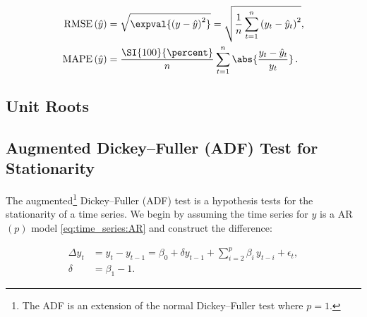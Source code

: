 \begin{subequations}\label{eq:time_series:RMSE_MAPE}
\begin{align}
\text{RMSE}\left(\hat{y}\right) &= \sqrt{\expval{\left(y - \hat{y}\right)^{2}}} = \sqrt{\frac{1}{n}\sum_{t=1}^{n} \left(y_{t} - \hat{y}_{t}\right)^{2}}, \label{eq:time_series:RMSE} \\
\text{MAPE}\left(\hat{y}\right) &= \frac{\SI{100}{\percent}}{n} \sum_{t=1}^{n} \abs{\frac{y_{t} - \hat{y}_{t}}{y_{t}}}\,. \label{eq:time_series:MAPE}
\end{align}
\end{subequations}


\subsection{Unit Roots}
\label{additional:time_series:unit_root}

\subsection{Augmented Dickey--Fuller (ADF) Test for Stationarity}
\label{additional:time_series:ADF}

The augmented\footnote{The ADF is an extension of the normal Dickey--Fuller test where $p = 1$.} Dickey--Fuller (ADF) test
is a hypothesis tests for the stationarity of a time series.
We begin by assuming the time series for $y$ is a AR$\left(p\right)$ model \cref{eq:time_series:AR}
and construct the difference:

\begin{subequations}\label{eq:time_series:ADF}
\begin{align}
\Delta y_{t} &= y_{t} - y_{t-1} = \beta_{0} + \delta y_{t-1} + \sum_{i=2}^{p} \beta_{i}\, y_{t-i} + \epsilon_{t}, \label{eq:time_series:ADF:Delta_y} \\
\delta &= \beta_{1} - 1. \label{eq:time_series:ADF:delta}
\end{align}
\end{subequations}

